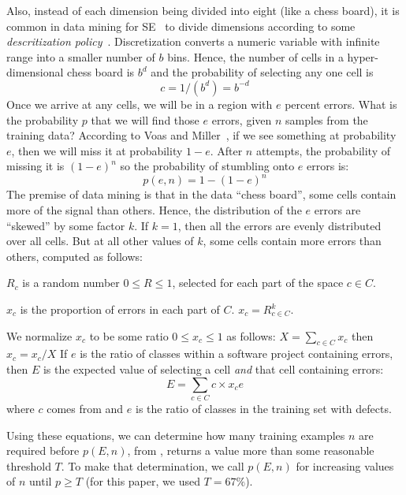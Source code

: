Also,
instead of each dimension being divided into eight (like a chess board), it is common in data mining for SE~\cite{Menzies2014a}
to divide dimensions according to some {\em descritization policy}~\cite{lust08}.
Discretization converts a numeric variable with infinite range into a smaller number of  $b$ bins. Hence, the number of cells in a
hyper-dimensional chess board is $b^d$ and the probability of selecting any one cell is
\begin{equation}\label{eq:c}c=1/(b^d)=b^{-d}\end{equation}
Once we arrive at any cells, we will be in a region with $e$ percent errors.
What  is the probability $p$ that we will find those $e$ errors, given $n$ samples from the training data?
According to Voas and Miller~\cite{voas1995software},
if we see something at probability $e$, then we will miss it at probability $1-e$.
After $n$ attempts, the probability of missing it is $(1-e)^n$ so the probability of stumbling onto $e$ errors is:
\begin{equation}\label{eq:p}
p(e,n) = 1-(1-e)^n
\end{equation}
The premise of data mining is that in the data ``chess board'', some cells contain more of the signal than others. Hence, the 
distribution of the $e$ errors are ``skewed'' by some factor $k$. If $k=1$, then all the errors are evenly distributed over all cells.
But at all other values of $k$, some cells contain more errors than others, computed as follows:
    \squishlist
  \item $R_c$ is a random number $0\le R \le 1$, selected for each part of the space $c\in C$.
  \item $x_c$ is the proportion of errors in each part of $C$. \mbox{$x_c =  R_{c\in C}^k$}.
  \item We normalize $x_c$ to be some ratio $0 \le x_c \le 1$ as follows: $X= \sum_{c\in C} x_c$ then $x_c = x_c/X$
    \squishend
    If  $e$ is the ratio of classes within a software project containing errors, then $E$ 
    is the expected value  of selecting a cell {\em and} that cell containing errors:
    \begin{equation}\label{eq:E}
     E   = \sum_{c\in C}c \times x_ce
    \end{equation}
    where $c$ comes from  and $e$ is the ratio of classes in the training set with defects.


Using these equations, we can determine how many
training examples $n$ are required before $p(E,n)$, from 
, returns a value more than some reasonable
threshold $T$.  To make that determination, we call
$p(E,n)$ for increasing values of $n$ until $p \ge
T$ (for this paper, we used $T = 67\%$).

